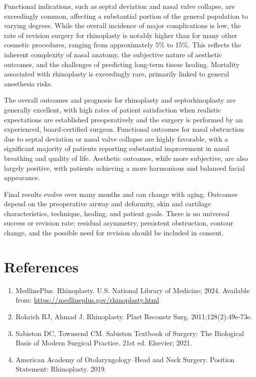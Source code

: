 Functional indications, such as septal deviation and nasal valve collapse, are exceedingly common, affecting a substantial portion of the general population to varying degrees. While the overall incidence of major complications is low, the rate of revision surgery for rhinoplasty is notably higher than for many other cosmetic procedures, ranging from approximately 5\% to 15\%. This reflects the inherent complexity of nasal anatomy, the subjective nature of aesthetic outcomes, and the challenges of predicting long-term tissue healing. Mortality associated with rhinoplasty is exceedingly rare, primarily linked to general anesthesia risks.

The overall outcomes and prognosis for rhinoplasty and septorhinoplasty are generally excellent, with high rates of patient satisfaction when realistic expectations are established preoperatively and the surgery is performed by an experienced, board-certified surgeon. Functional outcomes for nasal obstruction due to septal deviation or nasal valve collapse are highly favorable, with a significant majority of patients reporting substantial improvement in nasal breathing and quality of life. Aesthetic outcomes, while more subjective, are also largely positive, with patients achieving a more harmonious and balanced facial appearance.

Final results evolve over many months and can change with aging. Outcomes depend on the preoperative airway and deformity, skin and cartilage characteristics, technique, healing, and patient goals. There is no universal success or revision rate; residual asymmetry, persistent obstruction, contour change, and the possible need for revision should be included in consent.

\section*{References}
\begin{enumerate}
  \item MedlinePlus. Rhinoplasty. U.S. National Library of Medicine; 2024. Available from: \url{https://medlineplus.gov/rhinoplasty.html}
  
  \item Rohrich RJ, Ahmad J. Rhinoplasty. Plast Reconstr Surg. 2011;128(2):49e-73e.
  
  \item Sabiston DC, Townsend CM. Sabiston Textbook of Surgery: The Biological Basis of Modern Surgical Practice. 21st ed. Elsevier; 2021.
  
  \item American Academy of Otolaryngology--Head and Neck Surgery. Position Statement: Rhinoplasty. 2019.
\end{enumerate}

\clearpage
